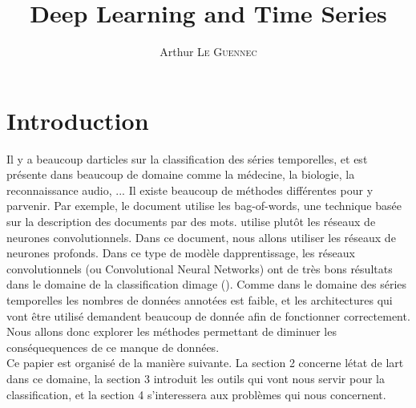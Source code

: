 \documentclass[11pt]{sdm}
\title{Deep Learning and Time Series}
\author{Arthur \textsc{Le Guennec}}
\begin{document}
\maketitle


\section{Introduction}

Il y a beaucoup d\textquotesingle articles sur la classification des s\'eries temporelles, et est pr\'esente dans beaucoup de domaine comme la m\'edecine, la biologie, la reconnaissance audio, ... Il existe beaucoup de m\'ethodes diff\'erentes pour y parvenir. Par exemple, le document \cite{bailly2015bag} utilise les bag-of-words, une technique bas\'ee sur la description des documents par des mots. \cite{zheng2014time} utilise plut\^ot les r\'eseaux de neurones convolutionnels.
Dans ce document, nous allons utiliser les r\'eseaux de neurones profonds. Dans ce type de mod\`ele d\textquotesingle apprentissage, les r\'eseaux convolutionnels (ou Convolutional Neural Networks) ont de tr\`es bons r\'esultats dans le domaine de la classification d\textquotesingle image (\cite{chatfield2014return}).
Comme dans le domaine des s\'eries temporelles les nombres de donn\'ees annot\'ees est faible, et les architectures qui vont \^etre utilis\'e demandent beaucoup de donn\'ee afin de fonctionner correctement. Nous allons donc explorer les m\'ethodes permettant de diminuer les cons\'equequences de ce manque de donn\'ees. \\
Ce papier est organis\'e de la mani\`ere suivante. La section 2 concerne l\textquotesingle \'etat de l\textquotesingle art dans ce domaine, la section 3 introduit les outils qui vont nous servir pour la classification, et la section 4 s'interessera aux probl\`emes qui nous concernent.

 
\end{document}
